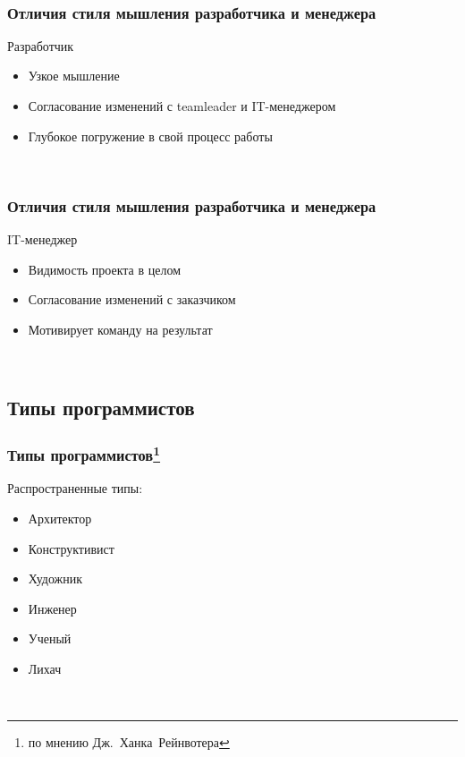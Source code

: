 \documentclass{../industrial-development}
\begin{document}
~\cite{How_to_be_a_good_IT-manager}

\begin{frame} \frametitle{Отличия стиля мышления разработчика и менеджера}
	\begin{block}{Разработчик}
\begin{itemize}
\item Узкое мышление
\item Согласование изменений с teamleader и IT-менеджером
\item Глубокое погружение в свой процесс работы
\end{itemize}
\end{block}
\end{frame}
\lecturenotes

~\cite{How_to_be_a_good_IT-manager}

\begin{frame} \frametitle{Отличия стиля мышления разработчика и менеджера}
	\begin{block}{IT-менеджер}
\begin{itemize}
\item Видимость проекта в целом
\item Согласование изменений с заказчиком 
\item Мотивирует команду на результат
\end{itemize}
\end{block}
\end{frame}
\lecturenotes

~\cite{How_to_be_a_good_IT-manager}

\subsection{Типы программистов}
\begin{frame} \frametitle{Типы программистов\footnote[1]{по мнению Дж.~Ханка~Рейнвотера}}
	\begin{block}{Распространенные типы:}
\begin{itemize}
\item Архитектор
\item Конструктивист 
\item Художник
\item Инженер
\item Ученый
\item Лихач
\end{itemize}
\end{block}
\end{frame}
\lecturenotes
~\cite{How_to_be_a_good_IT-manager}
\end{document}

